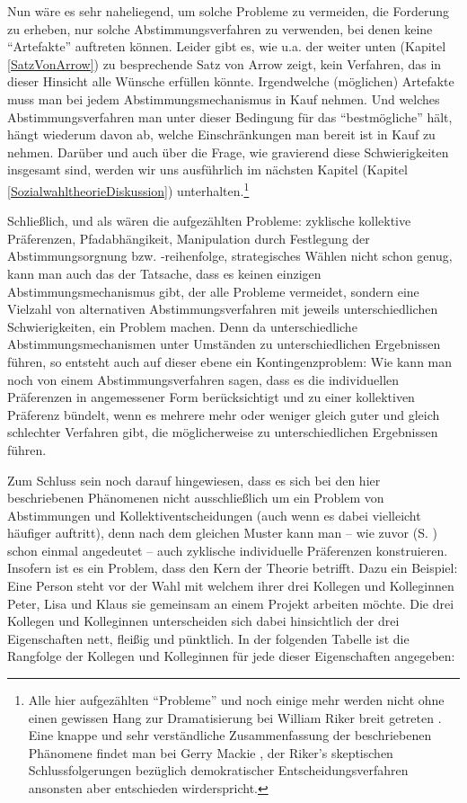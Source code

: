 Nun wäre es sehr naheliegend, um solche Probleme zu vermeiden, die Forderung zu
erheben, nur solche Abstimmungsverfahren zu verwenden, bei denen keine
"`Artefakte"' auftreten können. Leider gibt es, wie u.a. der weiter unten
(Kapitel \ref{SatzVonArrow}) zu besprechende Satz von Arrow zeigt, kein
Verfahren, das in dieser Hinsicht alle Wünsche erfüllen könnte. Irgendwelche
(möglichen) Artefakte muss man bei jedem Abstimmungsmechanismus in Kauf nehmen.
Und welches Abstimmungsverfahren man unter dieser Bedingung für das
"`bestmögliche"' hält, hängt wiederum davon ab, welche Einschränkungen man bereit
ist in Kauf zu nehmen. Darüber und auch über die Frage, wie gravierend diese
Schwierigkeiten insgesamt sind, werden wir uns ausführlich im nächsten Kapitel
(Kapitel \ref{SozialwahltheorieDiskussion}) unterhalten.\footnote{Alle hier
aufgezählten "`Probleme"' und noch einige mehr werden nicht ohne einen gewissen
Hang zur Dramatisierung bei William Riker breit getreten \cite[]{riker:1982}.
Eine knappe und sehr verständliche Zusammenfassung der beschriebenen Phänomene
findet man bei Gerry Mackie \cite[S. 5-9]{mackie:2003}, der Riker's skeptischen
Schlussfolgerungen bezüglich demokratischer Entscheidungsverfahren ansonsten aber
entschieden wirderspricht.}
 
Schließlich, und als wären die aufgezählten Probleme: zyklische kollektive
Präferenzen, Pfadabhängikeit, Manipulation durch Festlegung der
Abstimmungsorgnung bzw. -reihenfolge, strategisches Wählen nicht schon genug,
kann man auch das der Tatsache, dass es keinen einzigen Abstimmungsmechanismus
gibt, der alle Probleme vermeidet, sondern eine Vielzahl von alternativen
Abstimmungsverfahren mit jeweils unterschiedlichen Schwierigkeiten, ein Problem
machen. Denn da unterschiedliche Abstimmungsmechanismen unter Umständen zu
unterschiedlichen Ergebnissen führen, so entsteht auch auf dieser ebene ein
Kontingenzproblem: Wie kann man noch von einem Abstimmungsverfahren sagen, dass
es die individuellen Präferenzen in angemessener Form berücksichtigt und zu einer
kollektiven Präferenz bündelt, wenn es mehrere mehr oder weniger gleich guter und
gleich schlechter Verfahren gibt, die möglicherweise zu unterschiedlichen
Ergebnissen führen.

Zum Schluss sein noch darauf hingewiesen, dass es sich bei den hier beschriebenen
Phänomenen nicht ausschließlich um ein Problem von Abstimmungen und
Kollektiventscheidungen (auch wenn es dabei vielleicht häufiger auftritt), denn
nach dem gleichen Muster kann man -- wie zuvor (S.
\pageref{intransitivePraeferenzen}) schon einmal angedeutet -- auch zyklische
individuelle Präferenzen konstruieren. Insofern ist es ein Problem, dass den Kern
der Theorie betrifft. Dazu ein Beispiel: Eine Person steht vor der Wahl mit
welchem ihrer drei Kollegen und Kolleginnen Peter, Lisa und Klaus sie gemeinsam
an einem Projekt arbeiten möchte. Die drei Kollegen und Kolleginnen unterscheiden
sich dabei hinsichtlich der drei Eigenschaften nett, fleißig und pünktlich. In
der folgenden Tabelle ist die Rangfolge der Kollegen und Kolleginnen für jede
dieser Eigenschaften angegeben:

